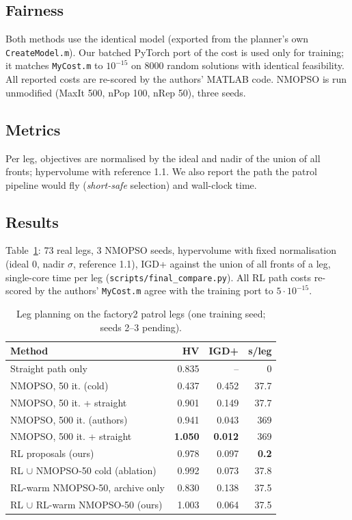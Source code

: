 \documentclass[conference]{IEEEtran}
\begin{document}
\subsection{Fairness}
Both methods use the identical model (exported from the planner's own \texttt{CreateModel.m}). Our
batched PyTorch port of the cost is used only for training; it matches \texttt{MyCost.m} to
$10^{-15}$ on 8000 random solutions with identical feasibility. All reported costs are re-scored by
the authors' MATLAB code. NMOPSO is run unmodified (MaxIt 500, nPop 100, nRep 50), three seeds.
\subsection{Metrics}
Per leg, objectives are normalised by the ideal and nadir of the union of all fronts; hypervolume
with reference 1.1. We also report the path the patrol pipeline would fly (\emph{short-safe}
selection) and wall-clock time.
\subsection{Results}
Table~\ref{tab:main}: 73 real legs, 3 NMOPSO seeds, hypervolume with fixed normalisation (ideal 0,
nadir $\sigma$, reference 1.1), IGD+ against the union of all fronts of a leg, single-core time per leg
(\texttt{scripts/final\_compare.py}). All RL path costs re-scored by the authors' \texttt{MyCost.m}
agree with the training port to $5\cdot10^{-15}$.
\begin{table}[t]\centering\small
\caption{Leg planning on the factory2 patrol legs (one training seed; seeds 2--3 pending).}\label{tab:main}
\begin{tabular}{lrrr}\toprule
Method & HV & IGD+ & s/leg\\\midrule
Straight path only & 0.835 & -- & 0\\
NMOPSO, 50 it. (cold) & 0.437 & 0.452 & 37.7\\
NMOPSO, 50 it. + straight & 0.901 & 0.149 & 37.7\\
NMOPSO, 500 it. (authors) & 0.941 & 0.043 & 369\\
NMOPSO, 500 it. + straight & \textbf{1.050} & \textbf{0.012} & 369\\\midrule
RL proposals (ours) & 0.978 & 0.097 & \textbf{0.2}\\
RL $\cup$ NMOPSO-50 cold (ablation) & 0.992 & 0.073 & 37.8\\
RL-warm NMOPSO-50, archive only & 0.830 & 0.138 & 37.5\\
RL $\cup$ RL-warm NMOPSO-50 (ours) & 1.003 & 0.064 & 37.5\\\bottomrule
\end{tabular}\end{table}
\end{document}
